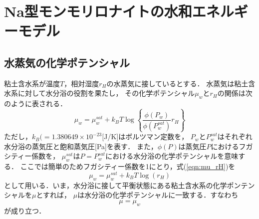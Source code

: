 ﻿\section{Na型モンモリロナイトの水和エネルギーモデル}
\subsection{水蒸気の化学ポテンシャル}
粘土含水系が温度$T$，相対湿度$r_H$の水蒸気に接しているとする．
水蒸気は粘土含水系に対して水分浴の役割を果たし，
その化学ポテンシャル$\mu_w$と$r_H$の関係は次のように表される\cite{Tombach}．
\begin{equation}
	\mu_w
	=
	\mu_w^{sat} +k_BT \log
	\left\{
		\frac{\phi(P_w)}{\phi(P^{sat}_w)}
		r_H
	\right\}
	\label{eqn:mu_rH}
\end{equation}
ただし，$k_B(=1.380649\times 10^{−23}$[J/K]はボルツマン定数を，
$P_w$と$P^{sat}_w$はそれぞれ水分浴の蒸気圧と飽和蒸気圧[Pa]を表す．
また，$\phi(P)$は蒸気圧$P$におけるフガシティー係数を，
$\mu_w^{sat}$は$P=P^{sat}_w$における水分浴の化学ポテンシャルを意味する．
ここでは簡単のためフガシティー係数を1にとり，式(\ref{eqn:mu_rH})を
\begin{equation}
	\mu_w
	=
	\mu_w^{sat} +k_BT \log
	\left(
		r_H
	\right)
	\label{eqn:mu_rH_simple}
\end{equation}
として用いる．いま，水分浴に接して平衡状態にある粘土含水系の化学ポンテンシャルを$\mu$とすれば， 
$\mu$は水分浴の化学ポテンシャルに一致する．すなわち
\begin{equation}
	\mu=\mu_{w}
	\label{eqn:equiv_mu}
\end{equation}
が成り立つ．
